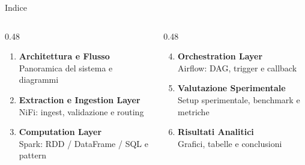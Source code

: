 \documentclass[10pt, aspectratio=169]{beamer}
\begin{document}
\begin{frame}{Indice}
    \vspace{-0.3cm}
    \begin{columns}[T]
        \begin{column}{0.48\textwidth}
            \begin{enumerate}
                \item \textbf{Architettura e Flusso}
                \\{\scriptsize Panoramica del sistema e diagrammi}
                \vspace{0.35cm}

                \item \textbf{Extraction e Ingestion Layer}
                \\{\scriptsize NiFi: ingest, validazione e routing}
                \vspace{0.35cm}

                \item \textbf{Computation Layer}
                \\{\scriptsize Spark: RDD / DataFrame / SQL e pattern}
            \end{enumerate}
        \end{column}

        \begin{column}{0.48\textwidth}
            \begin{enumerate}\setcounter{enumi}{3}
                \item \textbf{Orchestration Layer}
                \\{\scriptsize Airflow: DAG, trigger e callback}
                \vspace{0.35cm}

                \item \textbf{Valutazione Sperimentale}
                \\{\scriptsize Setup sperimentale, benchmark e metriche}
                \vspace{0.35cm}

                \item \textbf{Risultati Analitici}
                \\{\scriptsize Grafici, tabelle e conclusioni}
            \end{enumerate}
        \end{column}
    \end{columns}
\end{frame}
\end{document}
